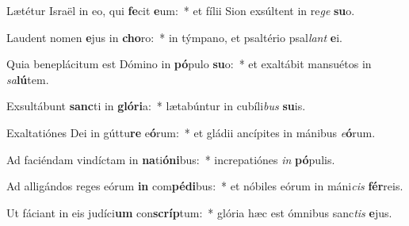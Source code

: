 \item Lætétur Israël in eo, qui \textbf{fe}cit \textbf{e}um:~* et fílii Sion exsúltent in re\textit{ge} \textbf{su}o.
\item Laudent nomen \textbf{e}jus in \textbf{cho}ro:~* in týmpano, et psaltério psal\textit{lant} \textbf{e}i.
\item Quia beneplácitum est Dómino in \textbf{pó}pulo \textbf{su}o:~* et exaltábit mansuétos in \textit{sa}\textbf{lú}tem.
\item Exsultábunt \textbf{sanc}ti in \textbf{gló}\textbf{ri}a:~* lætabúntur in cubíli\textit{bus} \textbf{su}is.
\item Exaltatiónes Dei in gúttu\textbf{re} e\textbf{ó}rum:~* et gládii ancípites in mánibus \textit{e}\textbf{ó}rum.
\item Ad faciéndam vindíctam in \textbf{na}ti\textbf{ó}\textbf{ni}bus:~* increpatiónes \textit{in} \textbf{pó}pulis.
\item Ad alligándos reges eórum \textbf{in} com\textbf{pé}\textbf{di}bus:~* et nóbiles eórum in máni\textit{cis} \textbf{fér}reis.
\item Ut fáciant in eis judíci\textbf{um} con\textbf{scríp}tum:~* glória hæc est ómnibus sanc\textit{tis} \textbf{e}jus.
